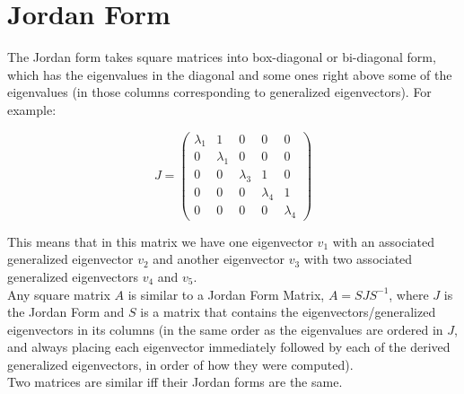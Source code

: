 \section*{Jordan Form}

The Jordan form takes square matrices into box-diagonal or bi-diagonal form, which has the eigenvalues in the diagonal and some ones right above some of the eigenvalues (in those columns corresponding to generalized eigenvectors). For example:

$$J=\begin{pmatrix}\lambda_1&1&0&0&0\\0&\lambda_1&0&0&0\\0&0&\lambda_3&1&0\\0&0&0&\lambda_4&1\\0&0&0&0&\lambda_4\end{pmatrix}$$

This means that in this matrix we have one eigenvector $v_1$ with an associated generalized eigenvector $v_2$ and another eigenvector $v_3$ with two associated generalized eigenvectors $v_4$ and $v_5$.\\

Any square matrix $A$ is similar to a Jordan Form Matrix, $A=SJS^{-1}$, where $J$ is the Jordan Form and $S$ is a matrix that contains the eigenvectors/generalized eigenvectors in its columns (in the same order as the eigenvalues are ordered in $J$, and always placing each eigenvector immediately followed by each of the derived generalized eigenvectors, in order of how they were computed).\\

Two matrices are similar iff their Jordan forms are the same.\\
